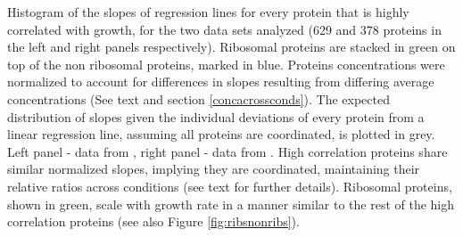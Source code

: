 \label{fig:globalfit}
    Histogram of the slopes of regression lines for every protein that is highly correlated with growth, for the two data sets analyzed (629 and 378 proteins in the left and right panels respectively).
    Ribosomal proteins are stacked in green on top of the non ribosomal proteins, marked in blue.
    Proteins concentrations were normalized to account for differences in slopes resulting from differing average concentrations (See text and section \ref{concacrossconds}).
    The expected distribution of slopes given the individual deviations of every protein from a linear regression line, assuming all proteins are coordinated, is plotted in grey.
    Left panel - data from \cite{Heinemann2015}, right panel - data from \cite{Valgepea2013}.
    High correlation proteins share similar normalized slopes, implying they are coordinated, maintaining their relative ratios across conditions (see text for further details).
    Ribosomal proteins, shown in green, scale with growth rate in a manner similar to the rest of the high correlation proteins (see also Figure \ref{fig:ribsnonribs}).
